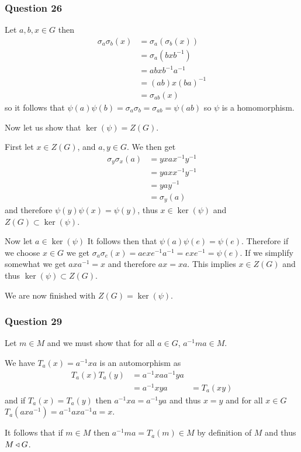 \documentclass{article}
\begin{document}
\subsubsection{Question 26}
 Let $a,b,x \in G$ then
\begin{align*}
\sigma_a\sigma_b(x) &= \sigma_a(\sigma_b(x)) \\
&= \sigma_a\left(bxb^{-1}\right) \\
&= abxb^{-1}a^{-1} \\
&= (ab)x(ba)^{-1} \\
&= \sigma_{ab}(x)
\end{align*} so it follows that $\psi(a)\psi(b) = \sigma_a\sigma_b = \sigma_{ab} = \psi(ab)$ so $\psi$ is a homomorphism.

Now let us show that $\ker(\psi) = Z(G)$.

First  let $x \in Z(G)$, and $a,y \in G$. We then get 
\begin{align*}
\sigma_y\sigma_x(a) &= yxax^{-1}y^{-1}\\
& = yaxx^{-1}y^{-1}\\
& = yay^{-1}\\
& = \sigma_y(a)
\end{align*}
and therefore $\psi(y)\psi(x) = \psi(y)$, thus $x\in\ker(\psi)$ and $Z(G) \subset \ker(\psi)$.

Now let $a \in \ker(\psi)$ It follows then that $\psi(a)\psi(e) = \psi(e)$. Therefore if we choose $x \in G$ we get $\sigma_a\sigma_e(x) = aexe^{-1}a^{-1} = exe^{-1} = \psi(e)$. If we simplify somewhat we get $axa^{-1} = x$ and therefore $ax=xa$. This implies $x \in Z(G)$ and thus $\ker(\psi) \subset Z(G)$.

We are now finished with $Z(G) = \ker(\psi)$.
\subsubsection{Question 29}
Let $m \in M$ and we must show that for all $a \in G$, $a^{-1}ma\in M$.

We have $T_a(x) = a^{-1}xa$ is an automorphism as 
\begin{align*}
T_a(x)T_a(y) &= a^{-1}xaa^{-1}ya \\
&= a^{-1}xya 
&= T_a(xy)
\end{align*}
and if $T_a(x) = T_a(y)$ then $a^{-1}xa = a^{-1}ya$ and thus $x=y$ and for all $x \in G$ $T_a(axa^{-1})=a^{-1}axa^{-1}a=x$.

It follows that if $m \in M$ then $a^{-1}ma = T_a(m) \in M$ by definition of $M$ and thus $M\triangleleft G$.
\end{document}
